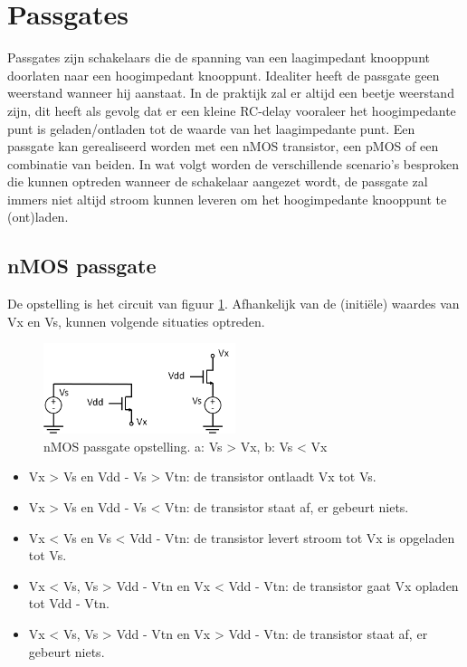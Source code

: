 \section{Passgates}
Passgates zijn schakelaars die de spanning van een laagimpedant knooppunt doorlaten naar een hoogimpedant knooppunt. Idealiter heeft de passgate geen weerstand wanneer hij aanstaat. In de praktijk zal er altijd een beetje weerstand zijn, dit heeft als gevolg dat er een kleine RC-delay vooraleer het hoogimpedante punt is geladen/ontladen tot de waarde van het laagimpedante punt.
Een passgate kan gerealiseerd worden met een nMOS transistor, een pMOS of een combinatie van beiden.
In wat volgt worden de verschillende scenario's besproken die kunnen optreden wanneer de schakelaar aangezet wordt, de passgate zal immers niet altijd stroom kunnen leveren om het hoogimpedante knooppunt te (ont)laden.

\subsection{nMOS passgate}
De opstelling is het circuit van figuur \ref{fig:passgate1}. Afhankelijk van de (initiële) waardes van Vx en Vs, kunnen volgende situaties optreden.

\begin{figure}[h!]
  \centering
  \includegraphics[width=0.5\textwidth]{../fig/hfdst-periphery-passgate1.png}
  \caption[nMOS passgate]{nMOS passgate opstelling. a: Vs > Vx, b: Vs < Vx}
  \label{fig:passgate1}
\end{figure}

\begin{itemize}
\item Vx > Vs en Vdd - Vs > Vtn: de transistor ontlaadt Vx tot Vs.
\item Vx > Vs en Vdd - Vs < Vtn: de transistor staat af, er gebeurt niets.
\item Vx < Vs en Vs < Vdd - Vtn: de transistor levert stroom tot Vx is opgeladen tot Vs.
\item Vx < Vs, Vs > Vdd - Vtn en Vx < Vdd - Vtn: de transistor gaat Vx opladen tot Vdd - Vtn.
\item Vx < Vs, Vs > Vdd - Vtn en Vx > Vdd - Vtn: de transistor staat af, er gebeurt niets.
\end{itemize}

